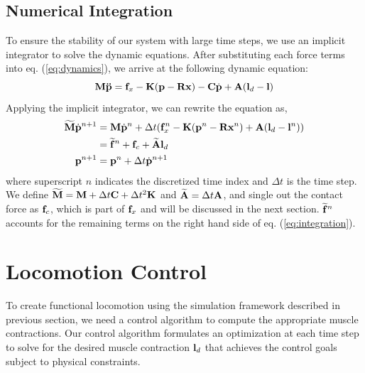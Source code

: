 \subsection{Numerical Integration}
To ensure the stability of our system with large time steps, we use an
implicit integrator to solve the dynamic equations. After substituting
each force terms into eq. (\ref{eq:dynamics}), we arrive at the following
dynamic equation:
\begin{equation}
\mathbf{M\ddot{p}}=\mathbf{f}_x-\mathbf{K}(\mathbf{p} -\mathbf{R}\mathbf{x}) -
\mathbf{C}\dot{\mathbf{p}} +\mathbf{A}(\mathbf{l}_d - \mathbf{l})
\end{equation}
Applying the implicit integrator, we can rewrite the equation as,
\begin{align}
\label{eq:integration}
\widetilde{\mathbf{M}}\dot{\mathbf{p}}^{n+1} & = \mathbf{M}\dot{\mathbf{p}}^{n} +
\Delta t(\mathbf{f}^n_{x} - \mathbf{K}(\mathbf{p}^n-\mathbf{R}\mathbf{x}^n)
+\mathbf{A}(\mathbf{l}_d-\mathbf{l}^n)) \nonumber \\
 & = \widetilde{\mathbf{f}}^n + \mathbf{f}_c + \widetilde{\mathbf{A}} \mathbf{l}_d \\
 \mathbf{p}^{n+1}& = \mathbf{p}^{n}+\Delta t \dot{\mathbf{p}}^{n+1}
\label{eq:nextState}
\end{align}
where superscript $n$ indicates the discretized time index and $\Delta
t$ is the time step. We define $\widetilde{\mathbf{M}}=\mathbf{M}+\Delta t\mathbf{C}+\Delta t^2\mathbf{K}$ and $\widetilde{\mathbf{A}}=\Delta t\mathbf{A}$, and
single out the contact force as $\mathbf{f}_c$, which is part of
$\mathbf{f}_x$ and will be discussed in the next
section. $\widetilde{\mathbf{f}}^n$ accounts for the remaining terms on
the right hand side of eq. (\ref{eq:integration}).


\section{Locomotion Control}
\label{sec:control}

To create functional locomotion using the simulation framework described
in previous section, we need a control algorithm to compute the appropriate
muscle contractions. Our control algorithm formulates an optimization at
each time step to solve for the desired muscle contraction $\mathbf{l}_d$ that
achieves the control goals subject to physical constraints.


